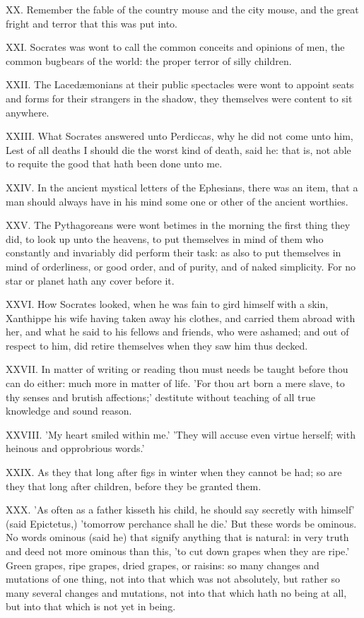 XX. Remember the fable of the country mouse and the city mouse, and the
great fright and terror that this was put into.

XXI. Socrates was wont to call the common conceits and opinions of men,
the common bugbears of the world: the proper terror of silly children.

XXII. The Lacedæmonians at their public spectacles were wont to appoint
seats and forms for their strangers in the shadow, they themselves were
content to sit anywhere.

XXIII. What Socrates answered unto Perdiccas, why he did not come unto
him, Lest of all deaths I should die the worst kind of death, said he:
that is, not able to requite the good that hath been done unto me.

XXIV. In the ancient mystical letters of the Ephesians, there was an
item, that a man should always have in his mind some one or other of the
ancient worthies.

XXV. The Pythagoreans were wont betimes in the morning the first thing
they did, to look up unto the heavens, to put themselves in mind of them
who constantly and invariably did perform their task: as also to put
themselves in mind of orderliness, or good order, and of purity, and of
naked simplicity. For no star or planet hath any cover before it.

XXVI. How Socrates looked, when he was fain to gird himself with a
skin, Xanthippe his wife having taken away his clothes, and carried them
abroad with her, and what he said to his fellows and friends, who were
ashamed; and out of respect to him, did retire themselves when they saw
him thus decked.

XXVII. In matter of writing or reading thou must needs be taught before
thou can do either: much more in matter of life. 'For thou art born a mere
slave, to thy senses and brutish affections;' destitute without teaching
of all true knowledge and sound reason.

XXVIII. 'My heart smiled within me.' 'They will accuse even virtue
herself; with heinous and opprobrious words.'

XXIX. As they that long after figs in winter when they cannot be had; so
are they that long after children, before they be granted them.

XXX. 'As often as a father kisseth his child, he should say secretly
with himself' (said Epictetus,) 'tomorrow perchance shall he die.' But
these words be ominous. No words ominous (said he) that signify anything
that is natural: in very truth and deed not more ominous than this, 'to
cut down grapes when they are ripe.' Green grapes, ripe grapes, dried
grapes, or raisins: so many changes and mutations of one thing, not into
that which was not absolutely, but rather so many several changes and
mutations, not into that which hath no being at all, but into that which
is not yet in being.


